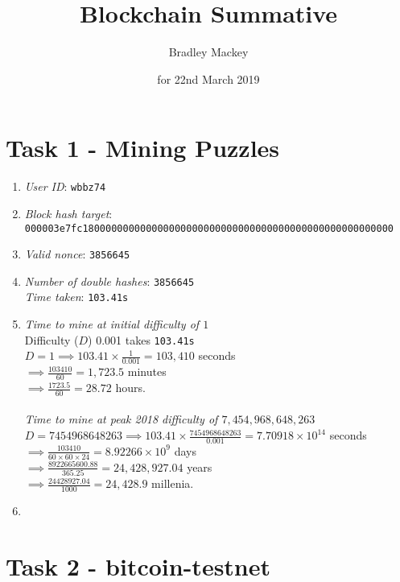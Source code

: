 \documentclass[11pt]{article}
\begin{document}
\title{\textbf{Blockchain Summative}}
\date{for 22nd March 2019}
\author{Bradley Mackey}
\maketitle


\section*{Task 1 - Mining Puzzles}

\begin{enumerate}
\item \textit{User ID}: \texttt{wbbz74}
\item \textit{Block hash target}: \texttt{000003e7fc180000000000000000000000000000000000000000000000000000}
\item \textit{Valid nonce}: \texttt{3856645}
\item \textit{Number of double hashes}: \texttt{3856645}\\\textit{Time taken}:  \texttt{103.41s}
\item 
\textit{Time to mine at initial difficulty of $1$}\\
Difficulty ($D$) 0.001 takes \texttt{103.41s}\\
$D=1 \implies 103.41\times{\frac{1}{0.001}}=103,410$ seconds\\
$\implies \frac{103410}{60}=1,723.5$ minutes\\
$\implies \frac{1723.5}{60}=28.72$ hours.\\
\\
\textit{Time to mine at peak 2018 difficulty of $7,454,968,648,263$}\\
$D=7454968648263 \implies 103.41\times{\frac{7454968648263}{0.001}}=7.70918\times10^{14}$ seconds\\
$\implies \frac{103410}{60\times60\times24}=8.92266\times10^{9}$ days\\
$\implies \frac{8922665600.88}{365.25}=24,428,927.04$ years\\
$\implies \frac{24428927.04}{1000}=24,428.9$ millenia.\\

\item 
\end{enumerate}

\section*{Task 2 - bitcoin-testnet}
\end{document}
